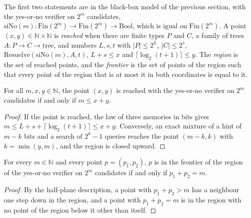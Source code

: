 The first two statements are in the black-box model of the previous section, with the yes-or-no
verifier on $2^m$ candidates, $\mathrm{siNo}(m) : \mathrm{Fin}(2^m) \to \mathrm{Fin}(2^m) \to
\mathrm{Bool}$, which is $\mathrm{igual}$ on $\mathrm{Fin}(2^m)$. A point $(x, y) \in \mathbb{N}
\times \mathbb{N}$ is \emph{reached} when there are finite types $P$ and $C$, a family of trees
$A : P \to C \to \text{tree}$, and numbers $L, s, t$ with $|P| \le 2^L$, $|C| \le 2^s$,
$\mathrm{Resuelve}(\mathrm{siNo}(m), A, t)$, $L + s \le x$ and $\lceil \log_2 (t + 1) \rceil \le y$.
The \emph{region} is the set of reached points, and the \emph{frontier} is the set of points of the
region such that every point of the region that is at most it in both coordinates is equal to it.

\begin{theorem}
  \label{thm:information-half-plane}
  \leanok
  For all $m, x, y \in \mathbb{N}$, the point $(x, y)$ is reached with the yes-or-no verifier on
  $2^m$ candidates if and only if $m \le x + y$.
  \own{}
\end{theorem}

\begin{proof}
  \leanok
  If the point is reached, the law of three memories in bits gives $m \le L + s + \lceil \log_2
  (t+1) \rceil \le x + y$. Conversely, an exact mixture of a hint of $m - k$ bits and a search of
  $2^k - 1$ queries reaches the point $(m - k, k)$ with $k = \min(y, m)$, and the region is closed
  upward.
\end{proof}

\begin{theorem}[The frontier of the yes-or-no verifier is the line $x + y = m$, in a black-box model]
  \label{thm:information-frontier-line}
  \leanok
  For every $m \in \mathbb{N}$ and every point $p = (p_1, p_2)$, $p$ is in the frontier of the
  region of the yes-or-no verifier on $2^m$ candidates if and only if $p_1 + p_2 = m$.
  \own{}
\end{theorem}

\begin{proof}
  \leanok
  By the half-plane description, a point with $p_1 + p_2 > m$ has a neighbour one step down in the
  region, and a point with $p_1 + p_2 = m$ is in the region with no point of the region below it
  other than itself.
\end{proof}

